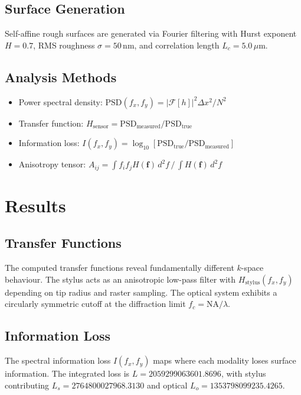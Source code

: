 \documentclass[review]{elsarticle}
\begin{document}
\subsection{Surface Generation}
Self-affine rough surfaces are generated via Fourier filtering with
Hurst exponent $H = 0.7$, RMS roughness
$\sigma = 50\,\mathrm{nm}$, and
correlation length $L_c = 5.0\,\mu\mathrm{m}$.

\subsection{Analysis Methods}
\begin{itemize}
    \item Power spectral density: $\mathrm{PSD}(f_x,f_y) = |\mathcal{F}[h]|^2 \Delta x^2 / N^2$
    \item Transfer function: $H_\mathrm{sensor} = \mathrm{PSD}_\mathrm{measured} / \mathrm{PSD}_\mathrm{true}$
    \item Information loss: $I(f_x,f_y) = \log_{10}[\mathrm{PSD}_\mathrm{true} / \mathrm{PSD}_\mathrm{measured}]$
    \item Anisotropy tensor: $A_{ij} = \int f_i f_j H(\mathbf{f}) \,d^2f \,/\, \int H(\mathbf{f}) \,d^2f$
\end{itemize}


\section{Results}
\label{sec:results}

\subsection{Transfer Functions}

The computed transfer functions reveal fundamentally different $k$-space
behaviour. The stylus acts as an anisotropic low-pass filter with
$H_\mathrm{stylus}(f_x,f_y)$ depending on tip radius and raster sampling.
The optical system exhibits a circularly symmetric cutoff at the diffraction
limit $f_c = \mathrm{NA}/\lambda$.

\subsection{Information Loss}

The spectral information loss $I(f_x,f_y)$ maps where each modality loses
surface information. The integrated loss is $L = 2059299063601.8696$,
with stylus contributing $L_s = 2764800027968.3130$ and
optical $L_o = 1353798099235.4265$.
\end{document}
